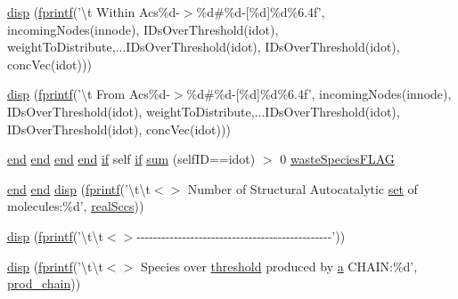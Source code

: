 \begin{DoxyCompactItemize}
\hyperlink{a00028_a2966730036d0549661e4d262b15beaf9}{disp} (\hyperlink{a00068_aa6dc40efe43a338c9ff278260d95b4d9}{fprintf}('\textbackslash{}t Within Acs\%d-\/$>$\%d\#\%d-\/\mbox{[}\%d\mbox{]}\%d\%6.\-4f', incoming\-Nodes(innode), I\-Ds\-Over\-Threshold(idot), weight\-To\-Distribute,...\-I\-Ds\-Over\-Threshold(idot), I\-Ds\-Over\-Threshold(idot), conc\-Vec(idot)))
\item 
\hyperlink{a00028_a5f7c41b053ae4e4e6df81041800ed0c1}{disp} (\hyperlink{a00068_aa6dc40efe43a338c9ff278260d95b4d9}{fprintf}('\textbackslash{}t From Acs\%d-\/$>$\%d\#\%d-\/\mbox{[}\%d\mbox{]}\%d\%6.\-4f', incoming\-Nodes(innode), I\-Ds\-Over\-Threshold(idot), weight\-To\-Distribute,...\-I\-Ds\-Over\-Threshold(idot), I\-Ds\-Over\-Threshold(idot), conc\-Vec(idot)))
\item 
\hyperlink{a00025_afb358f48b1646c750fb9da6c6585be2b}{end} \hyperlink{a00025_afb358f48b1646c750fb9da6c6585be2b}{end} \hyperlink{a00025_afb358f48b1646c750fb9da6c6585be2b}{end} \hyperlink{a00025_afb358f48b1646c750fb9da6c6585be2b}{end} \hyperlink{a00030_a01d55766b8058903dd360b4bda71f9f5}{if} self \hyperlink{a00030_a01d55766b8058903dd360b4bda71f9f5}{if} \hyperlink{a00028_a5330c3728d2e8d052841f1bbf8d33845}{sum} (self\-I\-D==idot) $>$ 0 \hyperlink{a00028_a86a34d23ef767cc82038231f868cea96}{waste\-Species\-F\-L\-A\-G}
\item 
\hyperlink{a00025_afb358f48b1646c750fb9da6c6585be2b}{end} \hyperlink{a00025_afb358f48b1646c750fb9da6c6585be2b}{end} \hyperlink{a00028_a00d6c60332efc3d721036c6f8283fa9b}{disp} (\hyperlink{a00068_aa6dc40efe43a338c9ff278260d95b4d9}{fprintf}('\textbackslash{}t\textbackslash{}t$<$$>$ Number of Structural Autocatalytic \hyperlink{a00028_ab178d77fe9330d344e5b21984e6dfd70}{set} of molecules\-:\%d', \hyperlink{a00028_a135a83e607075aa815c72f1ec0cbbc5a}{real\-Sccs}))
\item 
\hyperlink{a00028_afb873ef090cc25caaad4390f3b7bd082}{disp} (\hyperlink{a00068_aa6dc40efe43a338c9ff278260d95b4d9}{fprintf}('\textbackslash{}t\textbackslash{}t$<$$>$-\/-\/-\/-\/-\/-\/-\/-\/-\/-\/-\/-\/-\/-\/-\/-\/-\/-\/-\/-\/-\/-\/-\/-\/-\/-\/-\/-\/-\/-\/-\/-\/-\/-\/-\/-\/-\/-\/-\/-\/-\/-\/-\/-\/-\/-\/-\/'))
\item 
\hyperlink{a00028_a5fac2e70291daf3041076fa0a3db8d59}{disp} (\hyperlink{a00068_aa6dc40efe43a338c9ff278260d95b4d9}{fprintf}('\textbackslash{}t\textbackslash{}t$<$$>$ Species over \hyperlink{a00036_aa022cbb28f80299d572def08e7a5ccfd}{threshold} produced by \hyperlink{a00035_a2ffdbad9ea59541e59cbd2b938e0770c}{a} C\-H\-A\-I\-N\-:\%d', \hyperlink{a00028_ae0bd6421b7c81047a5234aeeb707efc4}{prod\-\_\-chain}))
$$
\end{DoxyCompactItemize}
